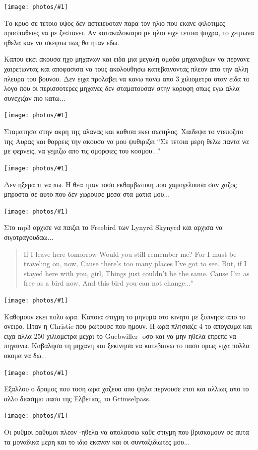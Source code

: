 \documentclass[11pt, letterpaper]{book}
\newcommand\photo[1]{\begin{center}\noindent\texttt{[image: photos/\#1]}\end{center}}
\begin{document}
\photo{56.jpg}

Το κρυο σε τετοιο υψος δεν αστειευοταν παρα τον ηλιο που εκανε φιλοτιμες προσπαθειες να με ζεστανει. Αν κατακαλοκαιρο με ηλιο ειχε τετοια ψυχρα, το χειμωνα ηθελα καν να σκεφτω πως θα ηταν εδω.

Καπου εκει ακουσα ηχο μηχανων και ειδα μια μεγαλη ομαδα μηχανοβιων να περνανε χαιρετωντας και αποφασισα να τους ακολουθησω κατεβαινοντας πλεον απο την αλλη πλευρα του βουνου. Δεν ειχα προλαβει να κανω πανω απο 3 χιλιομετρα οταν ειδα το λογο που οι περισσοτερες μηχανες δεν σταματουσαν στην κορυφη οπως εγω αλλα συνεχιζαν πιο κατω...

\photo{57.jpg}

Σταματησα στην ακρη της αλανας και καθισα εκει σωπηλος. Χαιδεψα το ντεποζιτο της Αυρας και θαρρεις την ακουσα να μου ψυθιριζει ``Σε τετοια μερη θελω παντα να με φερνεις, να γεμιζω απο τις ομορφιες του κοσμου...''

\photo{58.jpg}

Δεν ηξερα τι να πω. Η θεα ηταν τοσο εκθαμβωτικη που χαμογελουσα σαν χαζος μπροστα σε αυτο που δεν χωρουσε μεσα στα ματια μου...

\photo{59.jpg}

Στο mp3 αρχισε να παιζει το Freebird των Lynyrd Skynyrd και αρχισα να σιγοτραγουδαω...

\begin{verse}
If I leave here tomorrow
Would you still remember me?
For I must be traveling on, now,
Cause there's too many places I've got to see.
But, if I stayed here with you, girl,
Things just couldn't be the same.
Cause I'm as free as a bird now,
And this bird you can not change..."
\end{verse}

\photo{60.jpg}

Καθομουν εκει πολυ ωρα. Καποια στιγμη το μηνυμα στο κινητο με ξυπνησε απο το ονειρο. Ηταν η Christie που ρωτουσε που ημουν. Η ωρα πλησιαζε 4 το απογευμα και ειχα αλλα 250 χιλιομετρα μεχρι το Guebwiller -oσο και να μην ηθελα επρεπε να πηγαινω.
Καβαλησα τη μηχανη και ξεκινησα να κατεβαινω το πασο ομως ειχα πολλα ακομα να δω...

\photo{61.jpg}

Εξαλλου ο δρομος που τοση ωρα χαζευα απο ψηλα περνουσε ετσι και αλλιως απο το αλλο διασημο πασο της Ελβετιας, το Grimselpass.

\photo{62.jpg}

Οι ρυθμοι ραθυμοι πλεον -ηθελα να απολαυσω καθε στιγμη που βρισκομουν σε αυτα τα μοναδικα μερη και το ιδιο εκαναν και οι συνταξιδιωτες μου...
\end{document}
